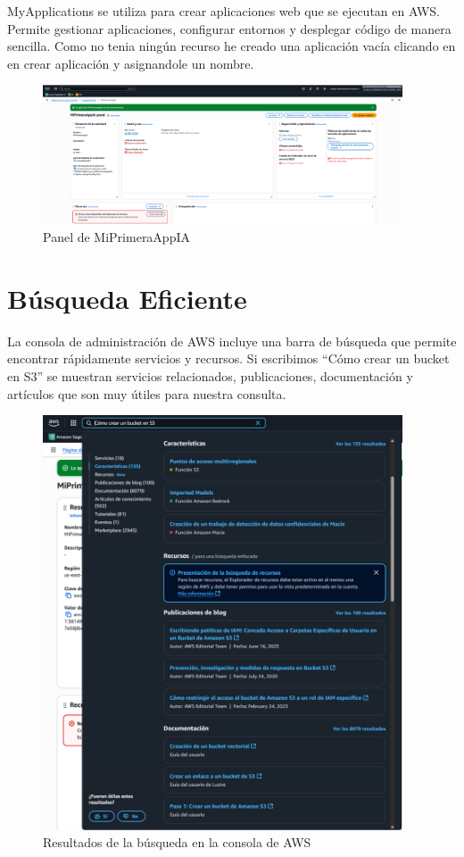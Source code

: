 \documentclass{article}
\begin{document}
	MyApplications se utiliza para crear aplicaciones web que se ejecutan en AWS. Permite gestionar aplicaciones, configurar entornos y desplegar código de manera sencilla. Como no tenia ningún recurso he creado una aplicación vacía clicando en en crear aplicación y asignandole un nombre.

	\begin{figure}[h!]
	\centering
	\includegraphics[width=0.95\textwidth]{tarea_4.png}
	\caption{Panel de MiPrimeraAppIA}
	\end{figure}

	\newpage

	\section{Búsqueda Eficiente}

	La consola de administración de AWS incluye una barra de búsqueda que permite encontrar rápidamente servicios y recursos. Si escribimos ``Cómo crear un bucket en S3'' se muestran servicios relacionados, publicaciones, documentación y artículos que son muy útiles para nuestra consulta.

	\begin{figure}[h!]
	\centering
	\includegraphics[width=0.95\textwidth]{tarea_5.png}
	\caption{Resultados de la búsqueda en la consola de AWS}
	\end{figure}
\end{document}
